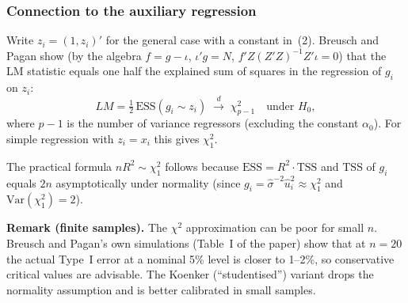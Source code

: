\documentclass[a4paper,oneside,12pt]{extarticle}
\theoremstyle{plain}
\theoremstyle{definition}
\theoremstyle{remark}
\begin{document}
\subsubsection*{Connection to the auxiliary regression}

Write $z_i = (1, z_i)'$ for the general case with a constant in~(2).
Breusch and Pagan show (by the algebra $f = g - \iota$, $\iota'g = N$,
$f'Z(Z'Z)^{-1}Z'\iota = 0$) that the LM statistic equals one half
the explained sum of squares in the regression of $g_i$ on $z_i$:
\[
  LM = \tfrac{1}{2}\,\mathrm{ESS}(g_i \sim z_i)
  \;\xrightarrow{d}\; \chi^2_{p-1}
  \quad\text{under }H_0,
\]
where $p-1$ is the number of variance regressors (excluding the
constant $\alpha_0$).  For simple regression with $z_i = x_i$ this
gives $\chi^2_1$.

The practical formula $nR^2 \sim \chi^2_1$ follows because
$\mathrm{ESS} = R^2 \cdot \mathrm{TSS}$ and $\mathrm{TSS}$ of $g_i$
equals $2n$ asymptotically under normality (since $g_i =
\hat\sigma^{-2}\hat{u}_i^2 \approx \chi^2_1$ and $\mathrm{Var}(\chi^2_1)
= 2$).

\medskip\noindent
\textbf{Remark (finite samples).}
The $\chi^2$ approximation can be poor for small $n$.
Breusch and Pagan's own simulations (Table~I of the paper) show that
at $n=20$ the actual Type~I error at a nominal 5\% level is closer to
1--2\%, so conservative critical values are advisable.
The Koenker (``studentised'') variant drops the normality assumption
and is better calibrated in small samples.

\end{document}
